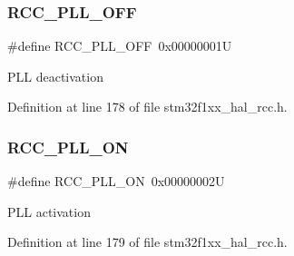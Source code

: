 \subsubsection{\texorpdfstring{R\+C\+C\+\_\+\+P\+L\+L\+\_\+\+O\+FF}{RCC\_PLL\_OFF}}
{\footnotesize\ttfamily \#define R\+C\+C\+\_\+\+P\+L\+L\+\_\+\+O\+FF~0x00000001U}

P\+LL deactivation 

Definition at line 178 of file stm32f1xx\+\_\+hal\+\_\+rcc.\+h.

\mbox{\label{group___r_c_c___p_l_l___config_gaf86dbee130304ba5760818f56d34ec91}} 
\subsubsection{\texorpdfstring{R\+C\+C\+\_\+\+P\+L\+L\+\_\+\+ON}{RCC\_PLL\_ON}}
{\footnotesize\ttfamily \#define R\+C\+C\+\_\+\+P\+L\+L\+\_\+\+ON~0x00000002U}

P\+LL activation 

Definition at line 179 of file stm32f1xx\+\_\+hal\+\_\+rcc.\+h.

